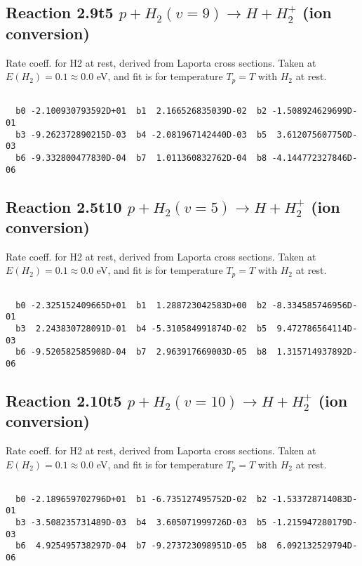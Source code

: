 \documentclass[12pt,dvipdfmx]{article}
\begin{document}
\newpage
\subsection{
Reaction 2.9t5
$ p + H_2(v=9) \rightarrow H + H_2^+$ (ion conversion)
}
Rate coeff. for H2 at rest, derived from Laporta cross sections.
Taken at $E(H_2) = 0.1 \approx 0.0$ eV,  and fit is for temperature $T_p=T$ with $H_2$ at rest.

\begin{small}\begin{verbatim}

  b0 -2.100930793592D+01  b1  2.166526835039D-02  b2 -1.508924629699D-01
  b3 -9.262372890215D-03  b4 -2.081967142440D-03  b5  3.612075607750D-03
  b6 -9.332800477830D-04  b7  1.011360832762D-04  b8 -4.144772327846D-06

\end{verbatim}\end{small}

\newpage
\subsection{
Reaction 2.5t10
$ p + H_2(v=5) \rightarrow H + H_2^+$ (ion conversion)
}
Rate coeff. for H2 at rest, derived from Laporta cross sections.
Taken at $E(H_2) = 0.1 \approx 0.0$ eV,  and fit is for temperature $T_p=T$ with $H_2$ at rest.

\begin{small}\begin{verbatim}

  b0 -2.325152409665D+01  b1  1.288723042583D+00  b2 -8.334585746956D-01
  b3  2.243830728091D-01  b4 -5.310584991874D-02  b5  9.472786564114D-03
  b6 -9.520582585908D-04  b7  2.963917669003D-05  b8  1.315714937892D-06

\end{verbatim}\end{small}

\newpage
\subsection{
Reaction 2.10t5
$ p + H_2(v=10) \rightarrow H + H_2^+$ (ion conversion)
}
Rate coeff. for H2 at rest, derived from Laporta cross sections.
Taken at $E(H_2) = 0.1 \approx 0.0$ eV,  and fit is for temperature $T_p=T$ with $H_2$ at rest.

\begin{small}\begin{verbatim}

  b0 -2.189659702796D+01  b1 -6.735127495752D-02  b2 -1.533728714083D-01
  b3 -3.508235731489D-03  b4  3.605071999726D-03  b5 -1.215947280179D-03
  b6  4.925495738297D-04  b7 -9.273723098951D-05  b8  6.092132529794D-06

\end{verbatim}\end{small}
\end{document}
